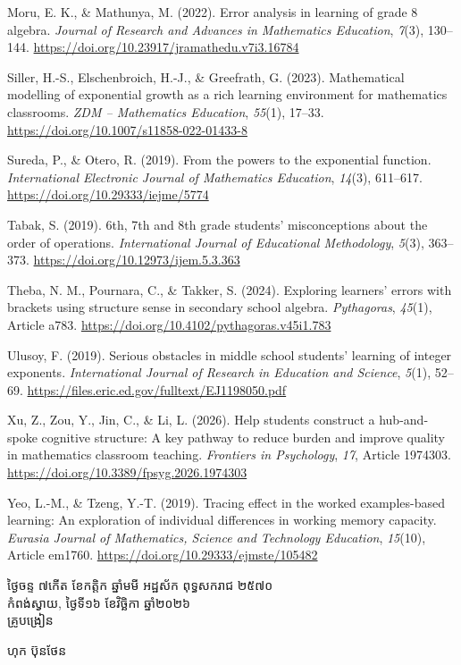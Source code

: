 \documentclass[a4paper,12pt]{article}
\newcommand{\en}[1]{{\TimesEn #1}}
\begin{document}
{Moru, E. K., \& Mathunya, M. (2022). Error analysis in learning of grade 8 algebra. \textit{Journal of Research and Advances in Mathematics Education}, \textit{7}(3), 130--144. \url{https://doi.org/10.23917/jramathedu.v7i3.16784}

Siller, H.-S., Elschenbroich, H.-J., \& Greefrath, G. (2023). Mathematical modelling of exponential growth as a rich learning environment for mathematics classrooms. \textit{ZDM -- Mathematics Education}, \textit{55}(1), 17--33. \url{https://doi.org/10.1007/s11858-022-01433-8}

Sureda, P., \& Otero, R. (2019). From the powers to the exponential function. \textit{International Electronic Journal of Mathematics Education}, \textit{14}(3), 611--617. \url{https://doi.org/10.29333/iejme/5774}

Tabak, S. (2019). 6th, 7th and 8th grade students' misconceptions about the order of operations. \textit{International Journal of Educational Methodology}, \textit{5}(3), 363--373. \url{https://doi.org/10.12973/ijem.5.3.363}

Theba, N. M., Pournara, C., \& Takker, S. (2024). Exploring learners' errors with brackets using structure sense in secondary school algebra. \textit{Pythagoras}, \textit{45}(1), Article a783. \url{https://doi.org/10.4102/pythagoras.v45i1.783}

Ulusoy, F. (2019). Serious obstacles in middle school students' learning of integer exponents. \textit{International Journal of Research in Education and Science}, \textit{5}(1), 52--69. \url{https://files.eric.ed.gov/fulltext/EJ1198050.pdf}

Xu, Z., Zou, Y., Jin, C., \& Li, L. (2026). Help students construct a hub-and-spoke cognitive structure: A key pathway to reduce burden and improve quality in mathematics classroom teaching. \textit{Frontiers in Psychology}, \textit{17}, Article 1974303. \url{https://doi.org/10.3389/fpsyg.2026.1974303}

Yeo, L.-M., \& Tzeng, Y.-T. (2019). Tracing effect in the worked examples-based learning: An exploration of individual differences in working memory capacity. \textit{Eurasia Journal of Mathematics, Science and Technology Education}, \textit{15}(10), Article em1760. \url{https://doi.org/10.29333/ejmste/105482}
\par}

\vspace{12pt}
\Needspace{2.2cm}
\hfill
\begin{minipage}{9.8cm}
  {\centering
    ថ្ងៃចន្ទ ៧កើត ខែកត្តិក ឆ្នាំមមី អដ្ឋស័ក ពុទ្ធសករាជ ២៥៧០\\[2pt]
    កំពង់ស្វាយ\en{,} ថ្ងៃទី១៦ ខែវិច្ឆិកា ឆ្នាំ២០២៦\\[3pt]
    {\muol គ្រូបង្រៀន}\par}
  \vspace{32pt}
  \hfill{\muol ហុក ប៊ុនថែន}\hspace*{1.4cm}
\end{minipage}
\end{document}
